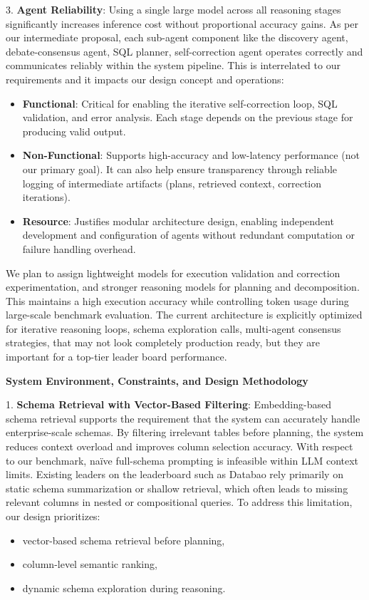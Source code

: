 3. \textbf{Agent Reliability}: Using a single large model across all reasoning stages significantly increases inference cost without proportional accuracy gains. As per our intermediate proposal, each sub-agent component like the discovery agent, debate-consensus agent, SQL planner, self-correction agent operates correctly and communicates reliably within the system pipeline. This is interrelated to our requirements and it impacts our design concept and operations:

\begin{itemize}
    \item \textbf{Functional}: Critical for enabling the iterative self-correction loop, SQL validation, and error analysis. Each stage depends on the previous stage for producing valid output.
    \item \textbf{Non-Functional}: Supports high-accuracy and low-latency performance (not our primary goal). It can also help ensure transparency through reliable logging of intermediate artifacts (plans, retrieved context, correction iterations).
    \item \textbf{Resource}: Justifies modular architecture design, enabling independent development and configuration of agents without redundant computation or failure handling overhead.
\end{itemize}

We plan to assign lightweight models for execution validation and correction experimentation, and stronger reasoning models for planning and decomposition. This maintains a high execution accuracy while controlling token usage during large-scale benchmark evaluation. The current architecture is explicitly optimized for iterative reasoning loops, schema exploration calls, multi-agent consensus strategies, that may not look completely production ready, but they are important for a top-tier leader board performance.

\textbf{System Environment, Constraints, and Design Methodology}

1. \textbf{Schema Retrieval with Vector-Based Filtering}: Embedding-based schema retrieval supports the requirement that the system can accurately handle enterprise-scale schemas. By filtering irrelevant tables before planning, the system reduces context overload and improves column selection accuracy. With respect to our benchmark, naïve full-schema prompting is infeasible within LLM context limits. Existing leaders on the leaderboard such as Databao \cite{jetbrains2026databao} rely primarily on static schema summarization or shallow retrieval, which often leads to missing relevant columns in nested or compositional queries. To address this limitation, our design prioritizes:
    \begin{itemize}
        \item vector-based schema retrieval before planning,
        \item column-level semantic ranking,
        \item dynamic schema exploration during reasoning.
    \end{itemize}

